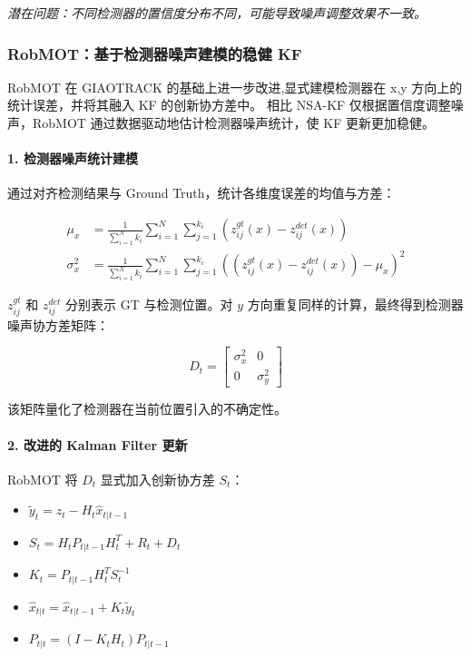 \documentclass{article}
\begin{document}
\textit{潜在问题：不同检测器的置信度分布不同，可能导致噪声调整效果不一致。}


\subsubsection*{RobMOT：基于检测器噪声建模的稳健 KF}

RobMOT 在 GIAOTRACK 的基础上进一步改进,显式建模检测器在 x,y 方向上的统计误差，并将其融入 KF 的创新协方差中。  
相比 NSA-KF 仅根据置信度调整噪声，RobMOT 通过数据驱动地估计检测器噪声统计，使 KF 更新更加稳健。

\paragraph{1. 检测器噪声统计建模}

通过对齐检测结果与 Ground Truth，统计各维度误差的均值与方差：

\begin{equation}
\begin{aligned}
\mu_{x} & = \frac{1}{\sum_{i=1}^{N} k_{i}} 
\sum_{i=1}^{N} \sum_{j=1}^{k_{i}} 
\left(z_{ij}^{gt}(x) - z_{ij}^{det}(x)\right) \\
\sigma_{x}^{2} & = \frac{1}{\sum_{i=1}^{N} k_{i}} 
\sum_{i=1}^{N} \sum_{j=1}^{k_{i}} 
\left(\left(z_{ij}^{gt}(x) - z_{ij}^{det}(x)\right) - \mu_{x}\right)^{2}
\end{aligned}
\end{equation}

$z_{ij}^{gt}$ 和 $z_{ij}^{det}$ 分别表示 GT 与检测位置。对 $y$ 方向重复同样的计算，最终得到检测器噪声协方差矩阵：

\begin{equation}
D_{t} = 
\begin{bmatrix}
\sigma_{x}^{2} & 0\\
0 & \sigma_{y}^{2}
\end{bmatrix}
\end{equation}

该矩阵量化了检测器在当前位置引入的不确定性。

\paragraph{2. 改进的 Kalman Filter 更新}

RobMOT 将 $D_t$ 显式加入创新协方差 $S_t$：

\begin{itemize}[leftmargin=10em,itemsep=2pt,parsep=0pt]
    \item $\tilde{y}_{t} = z_{t} - H_{t} \hat{x}_{t|t-1}$
    \item $S_{t} = H_{t} P_{t|t-1} H_{t}^{T} + R_{t} + D_{t}$
    \item $K_{t} = P_{t|t-1} H_{t}^{T} S_{t}^{-1}$
    \item $\hat{x}_{t|t} = \hat{x}_{t|t-1} + K_{t} \tilde{y}_{t}$
    \item $P_{t|t} = (I - K_{t} H_{t}) P_{t|t-1}$
\end{itemize}
\end{document}

